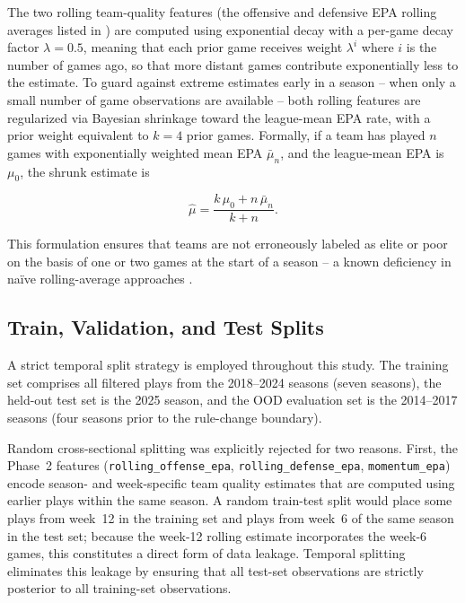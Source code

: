 The two rolling team-quality features (the offensive and defensive EPA
rolling averages listed in ) are computed using
exponential decay with a per-game decay factor $\lambda = 0.5$, meaning
that each prior game
receives weight $\lambda^{i}$ where $i$ is the number of games ago,
so that more distant games contribute exponentially less to the estimate. To guard
against extreme estimates early in a season -- when only a small number of
game observations are available -- both rolling features are regularized via
Bayesian shrinkage toward the league-mean EPA rate, with a prior weight
equivalent to $k = 4$ prior games. Formally, if a team has played $n$ games
with exponentially weighted mean EPA $\bar{\mu}_n$, and the league-mean EPA
is $\mu_0$, the shrunk estimate is

\begin{equation}
  \hat{\mu} = \frac{k\,\mu_0 + n\,\bar{\mu}_n}{k + n}.
\end{equation}

This formulation ensures that teams are not erroneously labeled as elite or
poor on the basis of one or two games at the start of a season -- a known
deficiency in na\"{i}ve rolling-average approaches
\parencite{lock2014randomforests}.

\subsection{Train, Validation, and Test Splits}
\label{sec:split}

A strict temporal split strategy is employed throughout this study. The
training set comprises all filtered plays from the 2018--2024 seasons (seven
seasons), the held-out test set is the 2025 season, and the OOD evaluation
set is the 2014--2017 seasons (four seasons prior to the rule-change
boundary).

Random cross-sectional splitting was explicitly rejected for two reasons.
First, the Phase~2 features (\texttt{rolling\_offense\_epa},
\texttt{rolling\_defense\_epa}, \texttt{momentum\_epa}) encode season- and
week-specific team quality estimates that are computed using earlier plays
within the same season. A random train-test split would place some plays
from week~12 in the training set and plays from week~6 of the same season
in the test set; because the week-12 rolling estimate incorporates the
week-6 games, this constitutes a direct form of data leakage. Temporal
splitting eliminates this leakage by ensuring that all test-set observations
are strictly posterior to all training-set observations.

